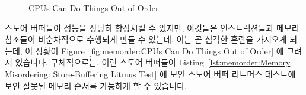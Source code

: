\begin{figure}[htb]
\centering
{}
\caption{CPUs Can Do Things Out of Order}
\end{figure}

스토어 버퍼들이 성능을 상당히 향상시킬 수 있지만, 이것들은 인스트럭션들과
메모리 참조들이 비순차적으로 수행되게 만들 수 있는데, 이는 곧 심각한 혼란을
가져오게 되는데, 이 상황이
Figure~\ref{fig:memorder:CPUs Can Do Things Out of Order} 에 그려져 있습니다.
구체적으로는, 이런 스토어 버퍼들이
Listing~\ref{lst:memorder:Memory Misordering: Store-Buffering Litmus Test} 에
보인 스토어 버퍼 리트머스 테스트에 보인 잘못된 메모리 순서를 가능하게 할 수
있습니다.

